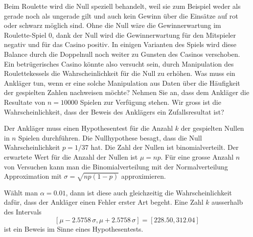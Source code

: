 Beim Roulette wird die Null speziell behandelt, weil sie zum Beispiel
weder als gerade noch als ungerade gilt und auch kein Gewinn über
die Einsätze auf rot oder schwarz möglich sind.
Ohne die Null wäre die Gewinnerwartung im Roulette-Spiel 0,
dank der Null wird die Gewinnerwartung für den Mitspieler negativ
und für das Casino positiv. 
In einigen Varianten des Spiels wird diese Balance durch die Doppelnull
noch weiter zu Gunsten des Casinos verschoben.
Ein betrügerisches Casino könnte also versucht sein, durch Manipulation
des Roulettekessels die Wahrscheinlichkeit für die Null zu erhöhen.
Was muss ein Ankläger tun, wenn er eine solche Manipulation
aus Daten über die Häufigkeit der gespielten Zahlen nachweisen möchte?
Nehmen Sie an, dass dem Ankläger die Resultate von $n=10000$ Spielen
zur Verfügung stehen.
Wir gross ist die Wahrscheinlichkeit, dass der Beweis des Anklägers
ein Zufallsresultat ist?

\begin{loesung}
Der Ankläger muss einen Hypothesentest für die Anzahl $k$ der gespielten
Nullen in $n$ Spielen durchführen.
Die Nullhypothese besagt, dass die Null Wahrscheinlichkeit $p=1/37$ hat.
Die Zahl der Nullen ist binomialverteilt.
Der erwartete Wert für die Anzahl der Nullen ist $\mu=np$.
Für eine grosse Anzahl $n$ von Versuchen kann man die Binomialverteilung
mit der Normalverteilung Approximation mit $\sigma = \sqrt{np(1-p)}$ 
approximieren.

Wählt man $\alpha=0.01$, dann ist diese auch gleichzeitig die
Wahrscheinlichkeit dafür, dass der Ankläger einen Fehler erster Art
begeht.
Eine Zahl $k$ ausserhalb des Intervals
\[
[ \mu - 2.5758\,\sigma, \mu + 2.5758\,\sigma]
=
[228.50, 312.04]
\]
ist ein Beweis im Sinne eines Hypothesentests.
\end{loesung}


